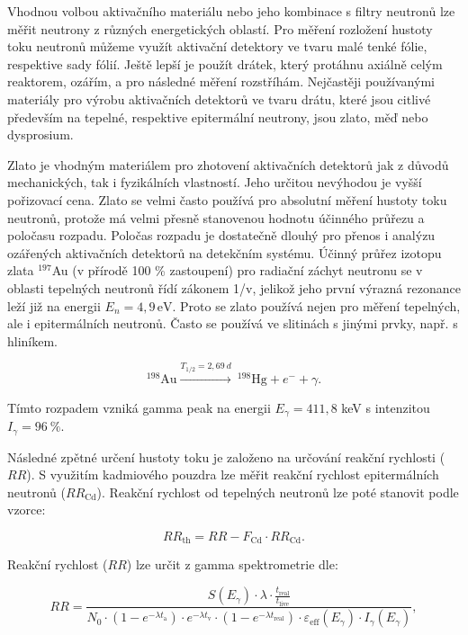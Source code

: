 Vhodnou volbou aktivačního materiálu nebo jeho kombinace s filtry neutronů lze měřit neutrony z různých energetických oblastí. Pro měření rozložení hustoty toku neutronů můžeme využít aktivační detektory ve tvaru malé tenké fólie, respektive sady fólií. Ještě lepší je použít drátek, který protáhnu axiálně celým reaktorem, ozářím, a pro následné měření rozstříhám. Nejčastěji používanými materiály pro výrobu aktivačních detektorů ve tvaru drátu, které jsou citlivé především na tepelné, respektive epitermální neutrony, jsou zlato, měď nebo dysprosium.

Zlato je vhodným materiálem pro zhotovení aktivačních detektorů jak z důvodů mechanických, tak i fyzikálních vlastností. Jeho určitou nevýhodou je vyšší pořizovací cena. Zlato se velmi často používá pro absolutní měření hustoty toku neutronů, protože má velmi přesně stanovenou hodnotu účinného průřezu a poločasu rozpadu. Poločas rozpadu je dostatečně dlouhý pro přenos i analýzu ozářených aktivačních detektorů na detekčním systému. Účinný průřez izotopu zlata $^{197}$Au (v přírodě 100 \% zastoupení) pro radiační záchyt neutronu se v oblasti tepelných neutronů řídí zákonem 1/v, jelikož jeho první výrazná rezonance leží již na energii $E_n = 4{,}9 \, \text{eV}$. Proto se zlato používá nejen pro měření tepelných, ale i epitermálních neutronů. Často se používá ve slitinách s jinými prvky, např. s hliníkem.

\begin{equation*}
    ^{198}\text{Au} \xrightarrow{T_{1/2} = 2,69\ d}\ ^{198}\text{Hg} + e^- + \gamma.
\end{equation*}

Tímto rozpadem vzniká gamma peak na energii $E_\gamma = 411,8$ keV s intenzitou $I_\gamma = 96\ \%$.

Následné zpětné určení hustoty toku je založeno na určování reakční rychlosti ($RR$). S využitím kadmiového pouzdra lze měřit reakční rychlost epitermálních neutronů ($RR_\text{Cd}$). Reakční rychlost od tepelných neutronů lze poté stanovit podle vzorce:

\begin{equation*}
    RR_\text{th} = RR - F_\text{Cd} \cdot RR_\text{Cd}.
\end{equation*}

Reakční rychlost ($RR$) lze určit z gamma spektrometrie dle:

\begin{equation}
   RR = \frac{S(E_{\gamma})\cdot \lambda \cdot \frac{t_{\text{real}}}{t_{\text{live}}}}{N_0 \cdot (1-e^{-\lambda t_{\text{a}}}) \cdot e^{-\lambda t_{\text{v}}} \cdot (1-e^{-\lambda t_{\text{real}}}) \cdot \varepsilon_\text{eff}(E_{\gamma}) \cdot I_{\gamma}(E_{\gamma})},
\end{equation}

